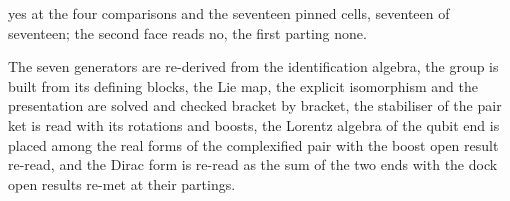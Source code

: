\begin{chtheorem}
yes at the four comparisons and the seventeen pinned cells, seventeen of seventeen; the second face reads no, the first parting none.
\end{chtheorem}
The seven generators are re-derived from the identification algebra, the group is built from its defining blocks, the Lie map, the explicit isomorphism and the presentation are solved and checked bracket by bracket, the stabiliser of the pair ket is read with its rotations and boosts, the Lorentz algebra of the qubit end is placed among the real forms of the complexified pair with the boost open result re-read, and the Dirac form is re-read as the sum of the two ends with the dock open results re-met at their partings.

